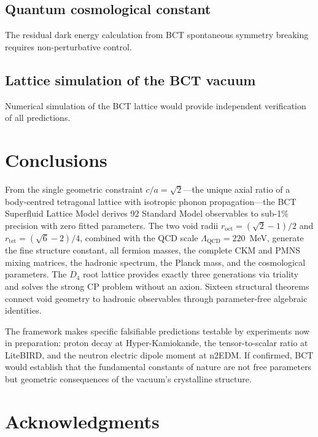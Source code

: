 \documentclass[review,number,sort&compress]{elsarticle}
\newcommand{\roct}{r_{\mathrm{oct}}}
\newcommand{\rtet}{r_{\mathrm{tet}}}
\newcommand{\LQCD}{\Lambda_{\mathrm{QCD}}}
\newcommand{\Dfour}{D_4}
\begin{document}
\subsection{Quantum cosmological constant}
The residual dark energy calculation from BCT spontaneous symmetry
breaking requires non-perturbative control.

\subsection{Lattice simulation of the BCT vacuum}
Numerical simulation of the BCT lattice would provide independent
verification of all predictions.

\section{Conclusions}
\label{sec:conclusions}

From the single geometric constraint $c/a = \sqrt{2}$---the unique
axial ratio of a body-centred tetragonal lattice with isotropic phonon
propagation---the BCT Superfluid Lattice Model derives 92 Standard
Model observables to sub-1\% precision with zero fitted parameters.
The two void radii $\roct = (\sqrt{2}-1)/2$ and
$\rtet = (\sqrt{6}-2)/4$, combined with the QCD scale
$\LQCD = 220$~MeV, generate the fine structure constant, all
fermion masses, the complete CKM and PMNS mixing matrices, the
hadronic spectrum, the Planck mass, and the cosmological parameters.
The $\Dfour$ root lattice provides exactly three generations via
triality and solves the strong CP problem without an axion. Sixteen
structural theorems connect void geometry to hadronic observables
through parameter-free algebraic identities.

The framework makes specific falsifiable predictions testable by
experiments now in preparation: proton decay at Hyper-Kamiokande,
the tensor-to-scalar ratio at LiteBIRD, and the neutron electric
dipole moment at n2EDM. If confirmed, BCT would establish that the
fundamental constants of nature are not free parameters but geometric
consequences of the vacuum's crystalline structure.
\section*{Acknowledgments}
\end{document}
